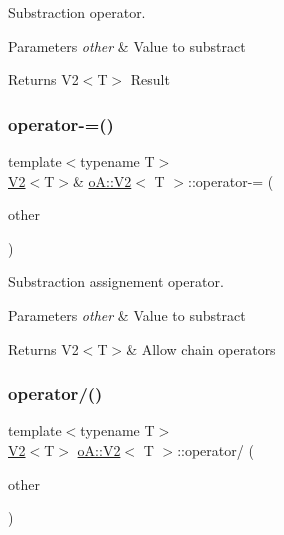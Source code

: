 Substraction operator. 


\begin{DoxyParams}{Parameters}
{\em other} & Value to substract \\
\hline
\end{DoxyParams}
\begin{DoxyReturn}{Returns}
V2$<$\+T$>$ Result 
\end{DoxyReturn}
\mbox{\label{structo_a_1_1_v2_a6e33681639974e51d66db212b7fcddbc}} 
\subsubsection{\texorpdfstring{operator-\/=()}{operator-=()}}
{\footnotesize\ttfamily template$<$typename T$>$ \\
\mbox{\hyperlink{structo_a_1_1_v2}{V2}}$<$T$>$\& \mbox{\hyperlink{structo_a_1_1_v2}{o\+A\+::\+V2}}$<$ T $>$\+::operator-\/= (\begin{DoxyParamCaption}\item[{const \mbox{\hyperlink{structo_a_1_1_v2}{o\+A\+::\+V2}}$<$ T $>$ \&}]{other }\end{DoxyParamCaption})\hspace{0.3cm}{\ttfamily [inline]}}



Substraction assignement operator. 


\begin{DoxyParams}{Parameters}
{\em other} & Value to substract \\
\hline
\end{DoxyParams}
\begin{DoxyReturn}{Returns}
V2$<$\+T$>$\& Allow chain operators 
\end{DoxyReturn}
\mbox{\label{structo_a_1_1_v2_a62fad7a505de2e093da7d9d8a01342c2}} 
\subsubsection{\texorpdfstring{operator/()}{operator/()}}
{\footnotesize\ttfamily template$<$typename T$>$ \\
\mbox{\hyperlink{structo_a_1_1_v2}{V2}}$<$T$>$ \mbox{\hyperlink{structo_a_1_1_v2}{o\+A\+::\+V2}}$<$ T $>$\+::operator/ (\begin{DoxyParamCaption}\item[{const \mbox{\hyperlink{structo_a_1_1_v2}{o\+A\+::\+V2}}$<$ T $>$ \&}]{other }\end{DoxyParamCaption})\hspace{0.3cm}{\ttfamily [inline]}}



